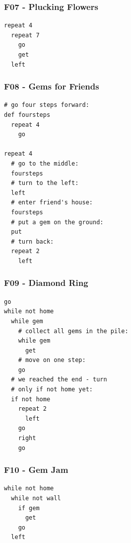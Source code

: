 \documentclass[article,A4,12pt]{llncs}
\begin{document}
\subsubsection{F07 - Plucking Flowers}
\begin{verbatim}
repeat 4
  repeat 7
    go
    get
  left
\end{verbatim}

\subsubsection{F08 - Gems for Friends}
\begin{verbatim}
# go four steps forward:
def foursteps
  repeat 4
    go

repeat 4
  # go to the middle:
  foursteps
  # turn to the left:
  left
  # enter friend's house:
  foursteps
  # put a gem on the ground:
  put
  # turn back:
  repeat 2
    left
\end{verbatim}

\subsubsection{F09 - Diamond Ring}
\begin{verbatim}
go
while not home
  while gem
    # collect all gems in the pile:
    while gem
      get
    # move on one step:
    go
  # we reached the end - turn 
  # only if not home yet:
  if not home
    repeat 2
      left
    go
    right
    go
\end{verbatim}

\subsubsection{F10 - Gem Jam}
\begin{verbatim}
while not home
  while not wall
    if gem
      get
    go
  left
\end{verbatim}
\end{document}
